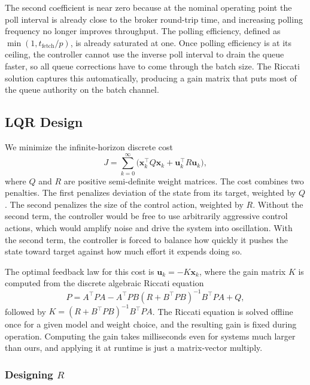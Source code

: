 \documentclass[10pt,a4paper]{article}
\begin{document}
The second coefficient is near zero because at the nominal operating point the poll interval is already close to the broker round-trip time, and increasing polling frequency no longer improves throughput. The polling efficiency, defined as $\min(1, t_{\text{fetch}} / p)$, is already saturated at one. Once polling efficiency is at its ceiling, the controller cannot use the inverse poll interval to drain the queue faster, so all queue corrections have to come through the batch size. The Riccati solution captures this automatically, producing a gain matrix that puts most of the queue authority on the batch channel.

\subsection{LQR Design}

We minimize the infinite-horizon discrete cost
\begin{equation}
J = \sum_{k=0}^{\infty} \bigl( \mathbf{x}_k^\top Q \mathbf{x}_k + \mathbf{u}_k^\top R \mathbf{u}_k \bigr),
\end{equation}
where $Q$ and $R$ are positive semi-definite weight matrices. The cost combines two penalties. The first penalizes deviation of the state from its target, weighted by $Q$. The second penalizes the size of the control action, weighted by $R$. Without the second term, the controller would be free to use arbitrarily aggressive control actions, which would amplify noise and drive the system into oscillation. With the second term, the controller is forced to balance how quickly it pushes the state toward target against how much effort it expends doing so.

The optimal feedback law for this cost is $\mathbf{u}_k = -K \mathbf{x}_k$, where the gain matrix $K$ is computed from the discrete algebraic Riccati equation
\begin{equation}
P = A^\top P A - A^\top P B (R + B^\top P B)^{-1} B^\top P A + Q,
\end{equation}
followed by $K = (R + B^\top P B)^{-1} B^\top P A$. The Riccati equation is solved offline once for a given model and weight choice, and the resulting gain is fixed during operation. Computing the gain takes milliseconds even for systems much larger than ours, and applying it at runtime is just a matrix-vector multiply.

\subsubsection{Designing $R$}
\end{document}
